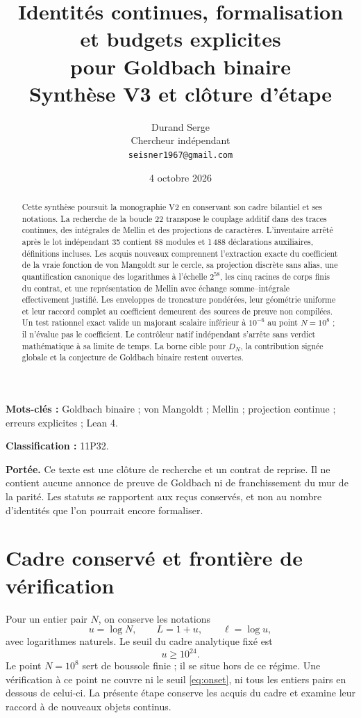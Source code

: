 \documentclass[11pt,a4paper]{article}
\title{Identités continues, formalisation et budgets explicites\\
pour Goldbach binaire\\[5pt]\large Synthèse V3 et clôture d'étape}
\author{Durand Serge\\\small Chercheur indépendant\\\small\texttt{seisner1967@gmail.com}}
\date{4 octobre 2026}
\theoremstyle{remark}
\begin{document}
\maketitle
\begin{abstract}
Cette synthèse poursuit la monographie V2 en conservant son cadre bilantiel et
ses notations. La recherche de la boucle 22 transpose le couplage additif dans
des traces continues, des intégrales de Mellin et des projections de caractères.
L'inventaire arrêté après le lot indépendant 35 contient 88 modules et
1\,488 déclarations auxiliaires, définitions incluses. Les acquis nouveaux
comprennent l'extraction exacte du coefficient de la vraie fonction de von
Mangoldt sur le cercle, sa projection discrète sans alias, une quantification
canonique des logarithmes à l'échelle $2^{58}$, les cinq racines de corps finis
du contrat, et une représentation de Mellin avec échange somme--intégrale
effectivement justifié. Les enveloppes de troncature pondérées, leur géométrie
uniforme et leur raccord complet au coefficient demeurent des sources de
preuve non compilées. Un test rationnel exact valide un majorant scalaire
inférieur à $10^{-6}$ au point $N=10^8$ ; il n'évalue pas le coefficient.
Le contrôleur natif indépendant s'arrête sans verdict mathématique à sa limite
de temps. La borne cible pour $D_N$, la contribution signée globale et la
conjecture de Goldbach binaire restent ouvertes.
\end{abstract}
\noindent\textbf{Mots-clés :} Goldbach binaire ; von Mangoldt ; Mellin ;
projection continue ; erreurs explicites ; Lean 4.
\par\noindent\textbf{Classification :} 11P32.
\par\noindent\textbf{Portée.} Ce texte est une clôture de recherche et un
contrat de reprise. Il ne contient aucune annonce de preuve de Goldbach ni de
franchissement du mur de la parité. Les statuts se rapportent aux reçus
conservés, et non au nombre d'identités que l'on pourrait encore formaliser.
\par{}

\clearpage
\section{Cadre conservé et frontière de vérification}\label{sec:frame}
Pour un entier pair $N$, on conserve les notations
\[
u=\log N,\qquad L=1+u,\qquad \ell=\log u,
\]
avec logarithmes naturels. Le seuil du cadre analytique fixé est
\begin{equation}\label{eq:onset}
u\ge 10^{24}.
\end{equation}
Le point $N=10^8$ sert de boussole finie ; il se situe hors de ce régime.
Une vérification à ce point ne couvre ni le seuil \eqref{eq:onset}, ni tous les
entiers pairs en dessous de celui-ci. La présente étape conserve les acquis
du cadre et examine leur raccord à de nouveaux objets continus.
\end{document}
